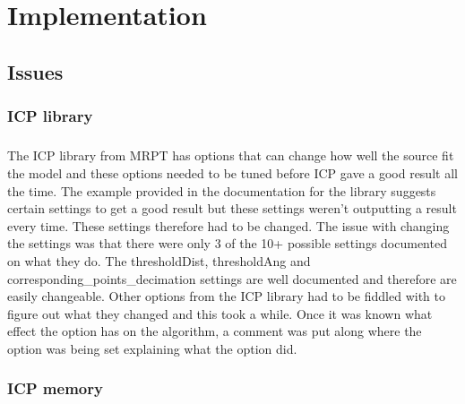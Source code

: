 \chapter{Implementation}

%
%
\section{Issues}
\subsection{ICP library}
\paragraph{}
The ICP library from MRPT has options that can change how well the source fit the model and these options needed to be tuned before ICP gave a good result all the time. The example provided in the documentation for the library suggests certain settings to get a good result but these settings weren't outputting a result every time. These settings therefore had to be changed. The issue with changing the settings was that there were only 3 of the 10+ possible settings documented on what they do. The thresholdDist, thresholdAng and corresponding\_points\_decimation settings are well documented and therefore are easily changeable. Other options from the ICP library had to be fiddled with to figure out what they changed and this took a while. Once it was known what effect the option has on the algorithm, a comment was put along where the option was being set explaining what the option did.

\subsection{ICP memory}

